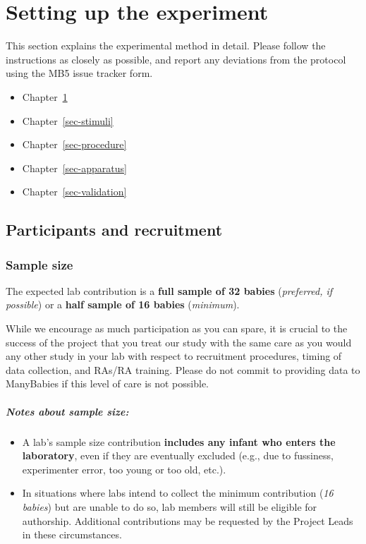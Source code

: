 \documentclass[
  letterpaper,
  DIV=11,
  numbers=noendperiod,
  oneside]{scrreprt}
\providecommand{\tightlist}{%
  \setlength{\itemsep}{0pt}\setlength{\parskip}{0pt}}
\begin{document}
\part{Setting up the experiment}

This section explains the experimental method in detail. Please follow
the instructions as closely as possible, and report any deviations from
the protocol using the MB5 issue tracker form.

\begin{itemize}
\tightlist
\item
  Chapter~\ref{sec-participants}
\item
  Chapter~\ref{sec-stimuli}
\item
  Chapter~\ref{sec-procedure}
\item
  Chapter~\ref{sec-apparatus}
\item
  Chapter~\ref{sec-validation}
\end{itemize}

\chapter{Participants and recruitment}\label{sec-participants}

\section{Sample size}\label{sample-size}

The expected lab contribution is a \textbf{full sample of 32 babies}
(\emph{preferred, if possible}) or a \textbf{half sample of 16 babies}
(\emph{minimum}).

While we encourage as much participation as you can spare, it is crucial
to the success of the project that you treat our study with the same
care as you would any other study in your lab with respect to
recruitment procedures, timing of data collection, and RAs/RA training.
Please do not commit to providing data to ManyBabies if this level of
care is not possible.

\subsubsection{Notes about sample size:}\label{notes-about-sample-size}

\begin{itemize}
\tightlist
\item
  A lab's sample size contribution \textbf{includes any infant who
  enters the laboratory}, even if they are eventually excluded (e.g.,
  due to fussiness, experimenter error, too young or too old, etc.).
\item
  In situations where labs intend to collect the minimum contribution
  (\emph{16 babies}) but are unable to do so, lab members will still be
  eligible for authorship. Additional contributions may be requested by
  the Project Leads in these circumstances.
\end{itemize}
\end{document}
